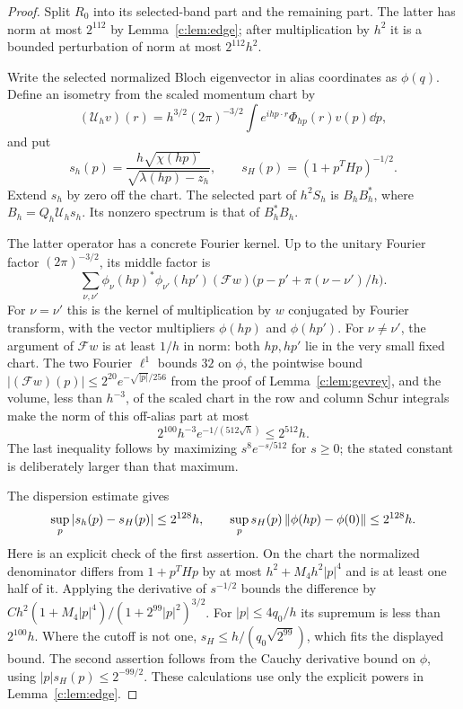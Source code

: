 \begin{proof}
Split $R_0$ into its selected-band part and the remaining part. The latter
has norm at most $2^{112}$ by Lemma~\ref{c:lem:edge}; after multiplication
by $h^2$ it is a bounded perturbation of norm at most $2^{112}h^2$.

Write the selected normalized Bloch eigenvector in alias coordinates as
$\phi(q)$. Define an isometry from the scaled momentum chart by
\[
 (\mathcal U_h v)(r)=h^{3/2}(2\pi)^{-3/2}
 \int e^{ihp\cdot r}\Phi_{hp}(r)v(p)\dd p,
\]
and put
\[
 s_h(p)=\frac{h\sqrt{\chi(hp)}}{\sqrt{\lambda(hp)-z_h}},
 \qquad s_H(p)=(1+p^THp)^{-1/2}.
\]
Extend $s_h$ by zero off the chart. The selected part of $h^2S_h$ is
$B_hB_h^*$, where $B_h=Q_h\mathcal U_hs_h$. Its nonzero spectrum is
that of $B_h^*B_h$.

The latter operator has a concrete Fourier kernel. Up to the unitary
Fourier factor $(2\pi)^{-3/2}$, its middle factor is
\begin{equation}
 \sum_{\nu,\nu'}\phi_\nu(hp)^*\phi_{\nu'}(hp')
 (\mathcal Fw)\big(p-p'+\pi(\nu-\nu')/h\big).                \label{c:eq:umklapp}
\end{equation}
For $\nu=\nu'$ this is the kernel of multiplication by $w$ conjugated by
Fourier transform, with the vector multipliers $\phi(hp)$ and $\phi(hp')$.
For $\nu\ne\nu'$, the argument of $\mathcal Fw$ is at least
$1/h$ in norm: both $hp,hp'$ lie in the very small fixed chart.
The two Fourier $\ell^1$ bounds $32$ on $\phi$, the pointwise bound
$|(\mathcal Fw)(p)|\le2^{20}e^{-\sqrt{|p|}/256}$ from the proof of
Lemma~\ref{c:lem:gevrey}, and the volume, less than $h^{-3}$, of the
scaled chart in the row and column Schur integrals make the norm of
this off-alias part at most
\begin{equation}
 2^{100}h^{-3}e^{-1/(512\sqrt h)}\le2^{512}h.           \label{c:eq:umklapperror}
\end{equation}
The last inequality follows by maximizing $s^8e^{-s/512}$ for $s\ge0$;
the stated constant is deliberately larger than that maximum.

The dispersion estimate gives
\begin{equation}
 \sup_p|s_h(p)-s_H(p)|\le2^{128}h,
 \qquad
 \sup_p s_H(p)\left\lVert \phi(hp)-\phi(0)\right\rVert\le2^{128}h.            \label{c:eq:multipliererror}
\end{equation}
Here is an explicit check of the first assertion. On the chart the
normalized denominator differs from $1+p^THp$ by at most
$h^2+M_4h^2|p|^4$ and is at least one half of it. Applying the derivative
of $s^{-1/2}$ bounds the difference by
$C h^2(1+M_4|p|^4)/(1+2^{99}|p|^2)^{3/2}$.
For $|p|\le4q_0/h$ its supremum is less than $2^{100}h$.
Where the cutoff is not one, $s_H\le h/(q_0\sqrt{2^{99}})$,
which fits the displayed bound. The second assertion follows from the
Cauchy derivative bound on $\phi$, using
$|p|s_H(p)\le2^{-99/2}$. These calculations use only the explicit
powers in Lemma~\ref{c:lem:edge}.


\end{proof}

